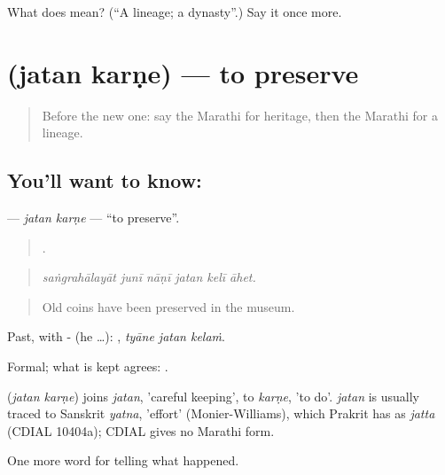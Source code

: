 \begin{tcolorbox}[breakable,colback=teal!4,colframe=teal!35!black,title={Before you move on}]
What does  mean? (\textquotedblleft{}A lineage; a dynasty\textquotedblright{}.) Say it once more.
\end{tcolorbox}
\section[\texorpdfstring{\mr{जतन} \mr{करणे} (jatan karṇe)}{जतन करणे (jatan karṇe)}]{  (jatan karṇe) — to preserve}

\label{lesson:MR-C308-jatan-karne}



\begin{quote}
Before the new one: say the Marathi for heritage, then the Marathi for a lineage.
\end{quote}

\subsection*{You'll want to know:  }
\textbf{ } — \emph{jatan karṇe} — \textquotedblleft{}to preserve\textquotedblright{}.

\begin{quote}
     .
\end{quote}

\begin{quote}
\emph{saṅgrahālayāt junī nāṇī jatan kelī āhet.}
\end{quote}

\begin{quote}
Old coins have been preserved in the museum.
\end{quote}

Past, with - (he …):   , \emph{tyāne jatan kelaṁ}.

Formal; what is kept agrees:   .

\begin{cousinweb}
\textbf{ } (\emph{jatan karṇe}) joins \emph{jatan}, 'careful keeping', to \emph{karṇe}, 'to do'. \emph{jatan} is usually traced to Sanskrit \emph{yatna}, 'effort' (Monier-Williams), which Prakrit has as \emph{jatta} (CDIAL 10404a); CDIAL gives no Marathi form.
\end{cousinweb}

\begin{grammarlens}[title={What you've built}]
One more word for telling what happened.
\end{grammarlens}

